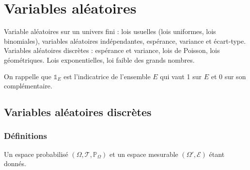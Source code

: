 
\section{Variables aléatoires}
Variable aléatoires sur un univers fini : lois usuelles (lois uniformes, lois binomiales), variables aléatoires
indépendantes, espérance, variance et écart-type. Variables aléatoires discrètes : espérance et variance, lois de
Poisson, lois géométriques. Lois exponentielles, loi faible des grands nombres.

On rappelle que \(𝟙_{𝐸}\) est l'indicatrice de l'ensemble \(𝐸\) qui vaut 1 sur \(𝐸\) et 0 sur son complémentaire.
\subsection{Variables aléatoires discrètes}
\subsubsection{Définitions}
Un espace probabilisé \((Ω,𝒯,ℙ_Ω)\) et un espace mesurable \((Ω',ℰ)\) étant donnés.
